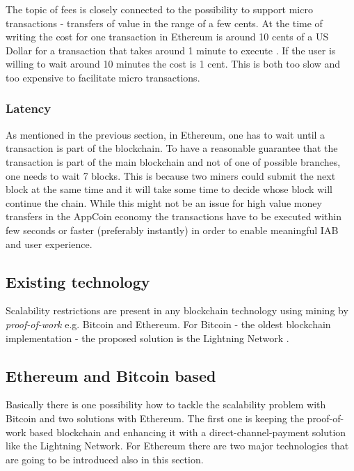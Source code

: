 The topic of fees is closely connected to the possibility to support micro transactions - transfers of value in the range of a few cents. At the time of writing the cost for one transaction in Ethereum is around 10 cents of a US Dollar for a transaction that takes around 1 minute to execute \cite{ethgasstation}. If the user is willing to wait around 10 minutes the cost is 1 cent. This is both too slow and too expensive to facilitate micro transactions.

\subsubsection{Latency}
As mentioned in the previous section, in Ethereum, one has to wait until a transaction is part of the blockchain. To have a reasonable guarantee that the transaction is part of the main blockchain and not of one of possible branches, one needs to wait 7 blocks. This is because two miners could submit the next block at the same time and it will take some time to decide whose block will continue the chain. While this might not be an issue for high value money transfers in the AppCoin economy the transactions have to be executed within few seconds or faster (preferably instantly) in order to enable meaningful IAB and user experience.

\subsection{Existing technology}
Scalability restrictions are present in any blockchain technology using mining by \textit{proof-of-work} e.g. Bitcoin and Ethereum. For Bitcoin - the oldest blockchain implementation - the proposed solution is the Lightning Network \cite{LighthingNetwork}.


\subsection{Ethereum and Bitcoin based}

Basically there is one possibility how to tackle the scalability problem with Bitcoin and two solutions with Ethereum. The first one is keeping the proof-of-work based blockchain and enhancing it with a direct-channel-payment solution like the Lightning Network. For Ethereum there are two major technologies that are going to be introduced also in this section.

